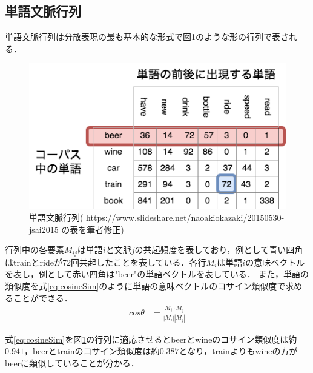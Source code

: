 \subsection{単語文脈行列}
\label{rel:wordEmbed:WordParagraphMat}
単語文脈行列は分散表現の最も基本的な形式で図\ref{Fig:WordParagraphMat}のような形の行列で表される．
\begin{figure}[htbp]
 \begin{center}
  \includegraphics[width=\textwidth]{../images/2.Related_Work/WordParagraphMatrix2.png}
  \caption{単語文脈行列( https://www.slideshare.net/naoakiokazaki/20150530-jsai2015 の表を筆者修正)}
  \label{Fig:WordParagraphMat}
  \vspace{-10pt}
 \end{center}
\end{figure}

行列中の各要素$M_{ij}$は単語$i$と文脈$j$の共起頻度を表しており，例として青い四角はtrainとrideが72回共起したことを表している．各行$M_i$は単語$i$の意味ベクトルを表し，例として赤い四角は"beer"の単語ベクトルを表している．
また，単語の類似度を式\ref{eq:cosineSim}のように単語の意味ベクトルのコサイン類似度で求めることができる．
\begin{equation}
\begin{aligned}
\label{eq:cosineSim}
cos \theta & = \frac{M_i \cdot M_j}{ | M_i | | M_j |}
\end{aligned}
\end{equation}

式\ref{eq:cosineSim}を図\ref{Fig:WordParagraphMat}の行列に適応させるとbeerとwineのコサイン類似度は約$0.941$，beerとtrainのコサイン類似度は約$0.387$となり，trainよりもwineの方がbeerに類似していることが分かる．
